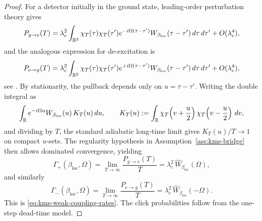 \begin{proof}
For a detector initially in the ground state, leading-order perturbation theory gives
\[
P_{g\to e}(T)
=
\lambda_c^2
\int_{\mathbb{R}^2}
\chi_T(\tau)\chi_T(\tau')
e^{-i\Omega(\tau-\tau')}
W_{\beta_{\mathrm{loc}}}(\tau-\tau')\,d\tau\,d\tau'
+
O(\lambda_c^4),
\]
and the analogous expression for de-excitation is
\[
P_{e\to g}(T)
=
\lambda_c^2
\int_{\mathbb{R}^2}
\chi_T(\tau)\chi_T(\tau')
e^{+i\Omega(\tau-\tau')}
W_{\beta_{\mathrm{loc}}}(\tau-\tau')\,d\tau\,d\tau'
+
O(\lambda_c^4),
\]
see \cite{BirDav1982,LoukoSatz2006,LoukoSatz2008}. By stationarity, the pullback depends only on $u=\tau-\tau'$. Writing the double integral as
\[
\int_{\mathbb{R}}
e^{-i\Omega u}
W_{\beta_{\mathrm{loc}}}(u)\,
K_T(u)\,du,
\qquad
K_T(u):=
\int_{\mathbb{R}}
\chi_T\!\left(v+\frac{u}{2}\right)
\chi_T\!\left(v-\frac{u}{2}\right)\,dv,
\]
and dividing by $T$, the standard adiabatic long-time limit gives $K_T(u)/T\to 1$ on compact $u$-sets. The regularity hypothesis in Assumption~\ref{ass:kms-bridge} then allows dominated convergence, yielding
\[
\Gamma_+(\beta_{\mathrm{loc}},\Omega)
=
\lim_{T\to\infty}\frac{P_{g\to e}(T)}{T}
=
\lambda_c^2\,\widehat{W}_{\beta_{\mathrm{loc}}}(\Omega),
\]
and similarly
\[
\Gamma_-(\beta_{\mathrm{loc}},\Omega)
=
\lim_{T\to\infty}\frac{P_{e\to g}(T)}{T}
=
\lambda_c^2\,\widehat{W}_{\beta_{\mathrm{loc}}}(-\Omega).
\]
This is \eqref{eq:kms-weak-coupling-rates}. The click probabilities follow from the one-step dead-time model.
\end{proof}

